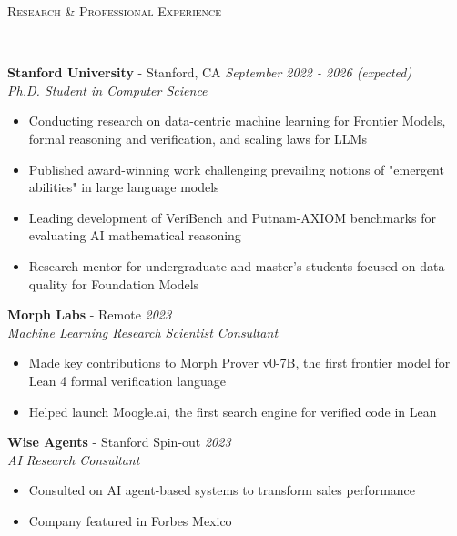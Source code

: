 \documentclass{article}
\newenvironment{changemargin}[2]{%
  \begin{list}{}{%
    \setlength{\topsep}{0pt}%
    \setlength{\leftmargin}{#1}%
    \setlength{\rightmargin}{#2}%
    \setlength{\listparindent}{\parindent}%
    \setlength{\itemindent}{\parindent}%
    \setlength{\parsep}{\parskip}%
  }%
  \item[]}{\end{list}
}
\newcommand{\lineover}{
	\begin{changemargin}{-0.05in}{-0.05in}
		\vspace*{-8pt}
		\hrulefill \\
		\vspace*{-2pt}
	\end{changemargin}
}
\newcommand{\header}[1]{
	\begin{changemargin}{-0.5in}{-0.5in}
		\scshape{#1}\\
  	\lineover
	\end{changemargin}
}
\newenvironment{body} {
	\vspace*{-16pt}
	\begin{changemargin}{-0.25in}{-0.5in}
  }	
	{\end{changemargin}
}
\begin{document}
\newpage

\header{Research \& Professional Experience}

\begin{body}
	\vspace{16pt}
 
    \textbf{Stanford University} - Stanford, CA \hfill \emph{September 2022 - 2026 (expected)}\\
	\emph{Ph.D. Student in Computer Science}\\
	\vspace*{-3pt}
	\begin{itemize} \itemsep -2pt  %
		\item Conducting research on data-centric machine learning for Frontier Models, formal reasoning and verification, and scaling laws for LLMs
		\item Published award-winning work challenging prevailing notions of "emergent abilities" in large language models
		\item Leading development of VeriBench and Putnam-AXIOM benchmarks for evaluating AI mathematical reasoning
		\item Research mentor for undergraduate and master's students focused on data quality for Foundation Models
	\end{itemize}
	\vspace{5 pt}

    \textbf{Morph Labs} - Remote \hfill \emph{2023}\\
	\emph{Machine Learning Research Scientist Consultant}\\
	\vspace*{-3pt}
	\begin{itemize} \itemsep -2pt
		\item Made key contributions to Morph Prover v0-7B, the first frontier model for Lean 4 formal verification language
		\item Helped launch Moogle.ai, the first search engine for verified code in Lean
	\end{itemize}
	\vspace{5 pt}
	
	\textbf{Wise Agents} - Stanford Spin-out \hfill \emph{2023}\\
	\emph{AI Research Consultant}\\
	\vspace*{-3pt}
	\begin{itemize} \itemsep -2pt
		\item Consulted on AI agent-based systems to transform sales performance
		\item Company featured in Forbes Mexico
	\end{itemize}
	\vspace{5 pt}


\end{body}
\end{document}
